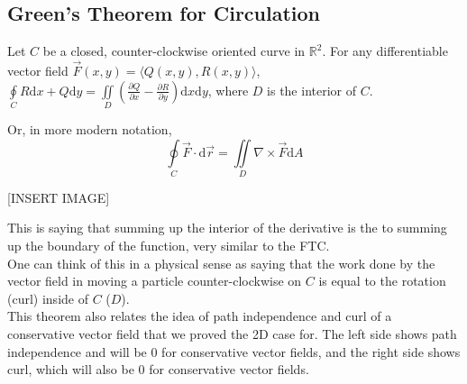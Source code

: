 \subsection{Green's Theorem for Circulation}
\begin{theorem}
	Let $C$ be a closed, counter-clockwise oriented curve in $\mathbb{R}^2$. For any differentiable vector field $\vec{F}(x,y) = \langle Q(x,y), R(x,y) \rangle$, $\oint\limits_{C}{R\mathrm{d}x + Q\mathrm{d}y} = \iint\limits_{D}{\left(\frac{\partial Q}{\partial x} - \frac{\partial R}{\partial y}\right)\mathrm{d}x\mathrm{d}y}$, where $D$ is the interior of $C$.
\end{theorem}
\noindent
Or, in more modern notation,
\begin{equation*}
	\oint\limits_{C}{\vec{F} \cdot \mathrm{d}\vec{r}} = \iint\limits_{D}{\nabla\times\vec{F}\mathrm{d}A}
\end{equation*}

[INSERT IMAGE]

\noindent
This is saying that summing up the interior of the derivative is the to summing up the boundary of the function, very similar to the FTC.\\
One can think of this in a physical sense as saying that the work done by the vector field in moving a particle counter-clockwise on $C$ is equal to the rotation (curl) inside of  $C$ ($D$).\\
This theorem also relates the idea of path independence and curl of a conservative vector field that we proved the 2D case for. The left side shows path independence and will be 0 for conservative vector fields, and the right side shows curl, which will also be 0 for conservative vector fields.

